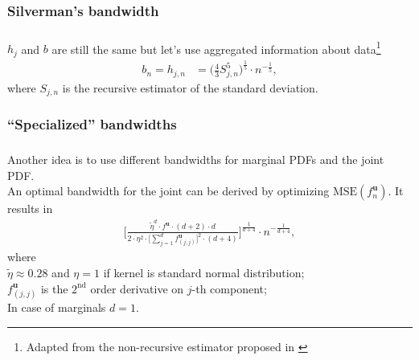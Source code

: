 \documentclass[aspectratio=169]{beamer}
\begin{document}
		\subsubsection{Silverman's bandwidth}
			\begin{frame}
				\frametitle{\insertsubsubsection}
				
				$ h_j $ and $ b $ are still the same but let's use aggregated information about data\footnote{Adapted from the non-recursive estimator proposed in \textcite{Silverman1986}}
				\begin{align}
				b_n = h_{j, n} &= \bigg(\frac{4}{3}S_{j, n}^5\bigg)^{\frac{1}{5}} \cdot n^{-\frac{1}{5}},
				\end{align}
				where $ S_{j,n} $ is the recursive estimator of the standard deviation.
				
			\end{frame}
		
		\subsubsection{``Specialized'' bandwidths}
			\begin{frame}
				\frametitle{\insertsubsubsection}
				
				Another idea is to use different bandwidths for marginal PDFs and the joint PDF.\\[1em]
				
				\onslide<2-> An optimal bandwidth for the joint can be derived by optimizing $ \text{MSE}(f^{\mathbf{u}}_n) $. It results in
				\begin{align}
				\Bigg[\frac{\widetilde{\eta}^d\cdot f^{\mathbf{u}}\cdot(d+2)\cdot d}{2\cdot\eta^2\cdot\big[\sum_{j=1}^{d}f^{\mathbf{u}}_{(j, j)}\big]^2\cdot(d+4)}\Bigg]^{\frac{1}{d+4}} \cdot n^{-\frac{1}{d+4}},
				\end{align}
				where \\[1ex]
				$ \widetilde{\eta} \approx 0.28 $ and $ \eta = 1 $ if kernel is standard normal distribution;\\[0.5ex]
				$ f^\mathbf{u}_{(j,j)} $ is the $ 2^{\text{nd}} $ order derivative on $ j $-th component;\\[0.5ex]
				In case of marginals $ d=1 $.
				
			\end{frame}
		
\end{document}
